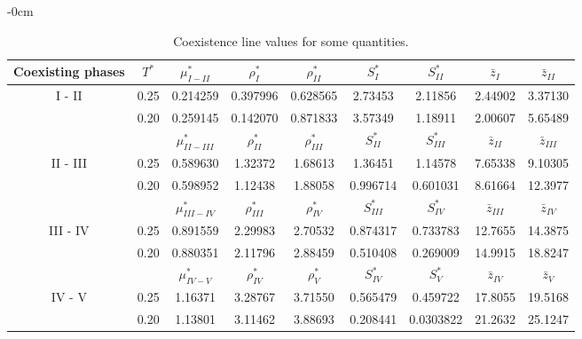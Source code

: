 \documentclass[entropy,article,submit,pdftex,moreauthors]{Definitions/mdpi}
\begin{document}
\begin{table}[H]
	\caption{Coexistence line values for some quantities.\label{tab2}}
	\begin{adjustwidth}{-\extralength}{0cm}
		\begin{tabularx}{\fulllength}{C|C|CCCCCCC}
		Coexisting phases	&$T^*$	& $\mu^*_{I-II}$	& $\rho^*_I$   & $\rho^*_{II}$ & $S^*_{I}$ & $S^*_{II}$ & $\bar{z}_{I}$ & $\bar{z}_{II}$ \\
			\midrule
			 &
			0.25 & 0.214259 & 0.397996 & 0.628565 & 2.73453 & 2.11856 & 2.44902 & 3.37130 \\
			&0.20 & 0.259145 & 0.142070 & 0.871833 & 3.57349 & 1.18911 & 2.00607 & 5.65489 \\
			
			\midrule
				& & $\mu^*_{II-III}$	& $\rho^*_{II}$   & $\rho^*_{III}$ & $S^*_{II}$ & $S^*_{III}$ & $\bar{z}_{II}$ & $\bar{z}_{III}$ \\
			\midrule
			& 0.25 & 0.589630 & 1.32372 & 1.68613 & 1.36451 & 1.14578 & 7.65338 & 9.10305 \\
			& 0.20 & 0.598952 & 1.12438 & 1.88058 & 0.996714 & 0.601031 & 8.61664 & 12.3977 \\
			
			\midrule
			& & $\mu^*_{III-IV}$	& $\rho^*_{III}$   & $\rho^*_{IV}$ & $S^*_{III}$ & $S^*_{IV}$ & $\bar{z}_{III}$ & $\bar{z}_{IV}$ \\
			\midrule
			& 0.25 & 0.891559 & 2.29983 & 2.70532 & 0.874317 &0.733783 & 12.7655 & 14.3875 \\
			& 0.20 & 0.880351 & 2.11796 & 2.88459 & 0.510408 & 0.269009 & 14.9915 & 18.8247 \\
			
			\midrule
			& & $\mu^*_{IV-V}$	& $\rho^*_{IV}$   & $\rho^*_{V}$ & $S^*_{IV}$ & $S^*_{V}$ & $\bar{z}_{IV}$ & $\bar{z}_{V}$\\
			\midrule
			& 0.25 & 1.16371 & 3.28767 & 3.71550 & 0.565479 & 0.459722 & 17.8055 & 19.5168 \\
			& 0.20 & 1.13801 & 3.11462 & 3.88693 & 0.208441 & 0.0303822 & 21.2632 & 25.1247 \\
			
			\bottomrule
		\end{tabularx}
	\end{adjustwidth}
\end{table}
\end{document}
